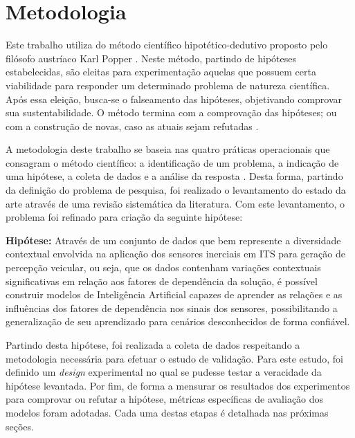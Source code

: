 \chapter{Metodologia}
\label{cap:metodologia}

Este trabalho utiliza do método científico hipotético-dedutivo proposto pelo filósofo austríaco Karl Popper \cite{Popper2002}. Neste método, partindo de hipóteses estabelecidas, são eleitas para experimentação aquelas que possuem certa viabilidade para responder um determinado problema de natureza científica. Após essa eleição, busca-se o falseamento das hipóteses, objetivando comprovar sua sustentabilidade. O método termina com a comprovação das hipóteses; ou com a construção de novas, caso as atuais sejam refutadas \cite{Bonat2009}.

A metodologia deste trabalho se baseia nas quatro práticas operacionais que consagram o método científico: a identificação de um problema, a indicação de uma hipótese, a coleta de dados e a análise da resposta \cite{Bonat2009}. Desta forma, partindo da definição do problema de pesquisa, foi realizado o levantamento do estado da arte através de uma revisão sistemática da literatura. Com este levantamento, o problema foi refinado para criação da seguinte hipótese: 

\begin{description}
\item{\textbf{Hipótese:}} Através de um conjunto de dados que bem represente a diversidade contextual envolvida na aplicação dos sensores inerciais em ITS para geração de percepção veicular, ou seja, que os dados contenham variações contextuais significativas em relação aos fatores de dependência da solução, é possível construir modelos de Inteligência Artificial capazes de aprender as relações e as influências dos fatores de dependência nos sinais dos sensores, possibilitando a generalização de seu aprendizado para cenários desconhecidos de forma confiável.
\end{description}

Partindo desta hipótese, foi realizada a coleta de dados respeitando a metodologia necessária para efetuar o estudo de validação. Para este estudo, foi definido um \textit{design} experimental no qual se pudesse testar a veracidade da hipótese levantada. Por fim, de forma a mensurar os resultados dos experimentos para comprovar ou refutar a hipótese, métricas específicas de avaliação dos modelos foram adotadas. Cada uma destas etapas é detalhada nas próximas seções.

